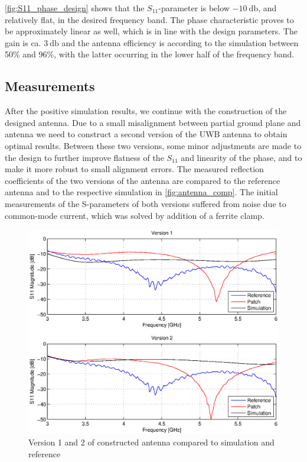 \documentclass[a4paper]{article}        %
\begin{document}
		\autoref{fig:S11_phase_design} shows that the $S_{11}$-parameter is below $\SI{-10}{\decibel}$, and relatively flat, in the desired frequency band. The phase characteristic proves to be approximately linear as well, which is in line with the design parameters. The gain is ca. $\SI{3}{\decibel}$ and the antenna efficiency is according to the simulation between 50\% and 96\%, with the latter occurring in the lower half of the frequency band. 

	\subsection{Measurements}
		After the positive simulation results, we continue with the construction of the designed antenna. Due to a small misalignment between partial ground plane and antenna we need to construct a second version of the UWB antenna to obtain optimal results. Between these two versions, some minor adjustments are made to the design to further improve flatness of the $S_{11}$ and linearity of the phase, and to make it more robust to small alignment errors. The measured reflection coefficients of the two versions of the antenna are compared to the reference antenna and to the respective simulation in \autoref{fig:antenna_comp}. The initial measurements of the S-parameters of both versions suffered from noise due to common-mode current, which was solved by addition of a ferrite clamp.

		\begin{figure}[H]
			\centering
			\includegraphics[width=\textwidth]{images/antenna/antenna_comparison.eps}
			\caption{Version 1 and 2 of constructed antenna compared to simulation and reference}
			\label{fig:antenna_comp}
		\end{figure}
\end{document}
